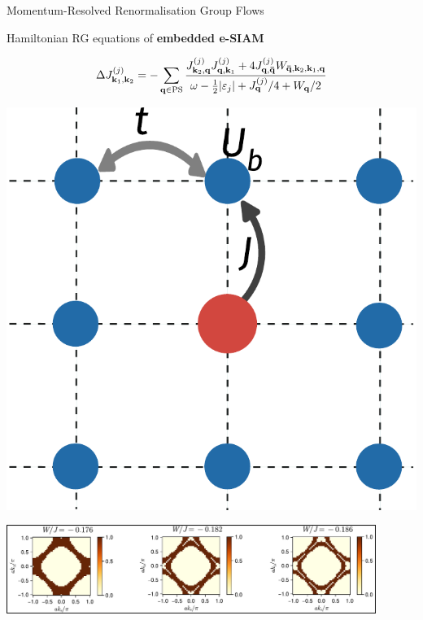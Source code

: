 \documentclass[12pt,aspectratio=169]{beamer}
\newcommand\focus[1]{%
	{\alert{\textbf{#1}}}
}
\begin{document}
\begin{frame}{Momentum-Resolved Renormalisation Group Flows}
\begin{minipage}{0.6\textwidth}
	Hamiltonian RG equations of \focus{embedded e-SIAM}
	\[\Delta J^{(j)}_{{\bf k}_1, {\bf k}_2} = -\sum_{{\bf q} \in \text{PS}} \frac{J^{(j)}_{{\bf k}_2,{\bf q}} J^{(j)}_{{\bf q},{\bf k}_1} + 4J^{(j)}_{{\bf q}, {\bf \bar q}} W_{{\bf \bar q}, {\bf k}_2, {\bf k}_1, {\bf q}}}{\omega - \frac{1}{2}|\varepsilon_j| + J^{(j)}_{{\bf q}}/4 + W_{{\bf q}}/2}\]
\end{minipage}
\hspace*{\fill}
\begin{minipage}{0.25\textwidth}
	\includegraphics[width=\textwidth]{pWaveEsiam.pdf}
\end{minipage}

\vspace*{\fill}
\includegraphics[width=0.9\textwidth]{scattProb.pdf}
	
\end{frame}
\end{document}
